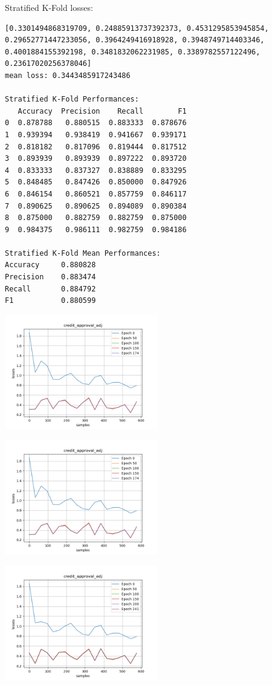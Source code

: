 Stratified K-Fold losses: 
\begin{verbatim}
[0.3301494868319709, 0.24885913737392373, 0.4531295853945854, 0.29652771447233056, 0.3964249416918928, 0.3948749714403346, 0.4001884155392198, 0.3481832062231985, 0.3389782557122496, 0.23617020256378046] 
mean loss: 0.3443485917243486

Stratified K-Fold Performances: 
   Accuracy  Precision    Recall        F1
0  0.878788   0.880515  0.883333  0.878676
1  0.939394   0.938419  0.941667  0.939171
2  0.818182   0.817096  0.819444  0.817512
3  0.893939   0.893939  0.897222  0.893720
4  0.833333   0.837327  0.838889  0.833295
5  0.848485   0.847426  0.850000  0.847926
6  0.846154   0.860521  0.857759  0.846117
7  0.890625   0.890625  0.894089  0.890384
8  0.875000   0.882759  0.882759  0.875000
9  0.984375   0.986111  0.982759  0.984186

Stratified K-Fold Mean Performances: 
Accuracy     0.880828
Precision    0.883474
Recall       0.884792
F1           0.880599
\end{verbatim}



\includegraphics[width=0.5\textwidth]{./figures/proj_credit_approval_adj_best.png}

\includegraphics[width=0.5\textwidth]{./figures/proj_credit_approval_adj_1.png}

\includegraphics[width=0.5\textwidth]{./figures/proj_credit_approval_adj_2.png}

